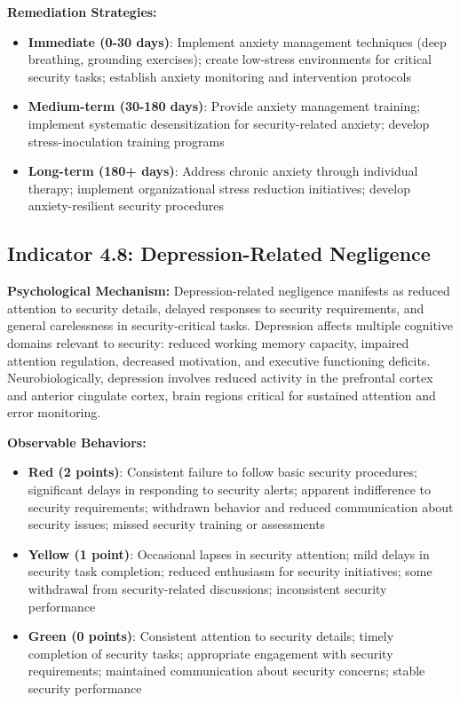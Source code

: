 \documentclass[11pt,a4paper]{article}
\begin{document}
\textbf{Remediation Strategies:}
\begin{itemize}
\item \textbf{Immediate (0-30 days)}: Implement anxiety management techniques (deep breathing, grounding exercises); create low-stress environments for critical security tasks; establish anxiety monitoring and intervention protocols
\item \textbf{Medium-term (30-180 days)}: Provide anxiety management training; implement systematic desensitization for security-related anxiety; develop stress-inoculation training programs
\item \textbf{Long-term (180+ days)}: Address chronic anxiety through individual therapy; implement organizational stress reduction initiatives; develop anxiety-resilient security procedures
\end{itemize}

\subsection{Indicator 4.8: Depression-Related Negligence}

\textbf{Psychological Mechanism:}
Depression-related negligence manifests as reduced attention to security details, delayed responses to security requirements, and general carelessness in security-critical tasks. Depression affects multiple cognitive domains relevant to security: reduced working memory capacity, impaired attention regulation, decreased motivation, and executive functioning deficits\cite{gotlib2010}. Neurobiologically, depression involves reduced activity in the prefrontal cortex and anterior cingulate cortex, brain regions critical for sustained attention and error monitoring.

\textbf{Observable Behaviors:}
\begin{itemize}
\item \textbf{Red (2 points)}: Consistent failure to follow basic security procedures; significant delays in responding to security alerts; apparent indifference to security requirements; withdrawn behavior and reduced communication about security issues; missed security training or assessments
\item \textbf{Yellow (1 point)}: Occasional lapses in security attention; mild delays in security task completion; reduced enthusiasm for security initiatives; some withdrawal from security-related discussions; inconsistent security performance
\item \textbf{Green (0 points)}: Consistent attention to security details; timely completion of security tasks; appropriate engagement with security requirements; maintained communication about security concerns; stable security performance
\end{itemize}
\end{document}
